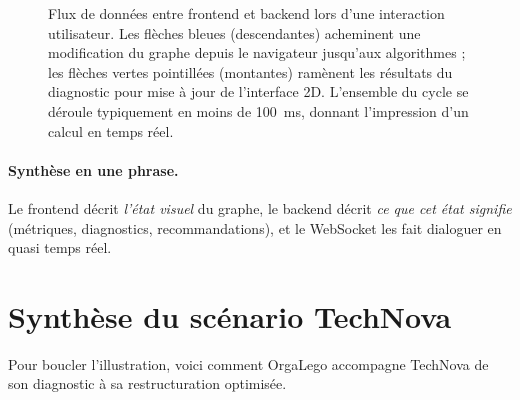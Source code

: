 \documentclass[11pt,a4paper]{article}
\begin{document}
\begin{figure}[h]
\caption{Flux de données entre frontend et backend lors d'une interaction utilisateur. Les flèches bleues (descendantes) acheminent une modification du graphe depuis le navigateur jusqu'aux algorithmes ; les flèches vertes pointillées (montantes) ramènent les résultats du diagnostic pour mise à jour de l'interface 2D. L'ensemble du cycle se déroule typiquement en moins de 100~ms, donnant l'impression d'un calcul en temps réel.}
\label{fig:flux}
\end{figure}

\paragraph{Synthèse en une phrase.} Le frontend décrit \emph{l'état visuel} du graphe, le backend décrit \emph{ce que cet état signifie} (métriques, diagnostics, recommandations), et le WebSocket les fait dialoguer en quasi temps réel.

\section{Synthèse du scénario TechNova}

Pour boucler l'illustration, voici comment OrgaLego accompagne TechNova de son diagnostic à sa restructuration optimisée.
\end{document}
